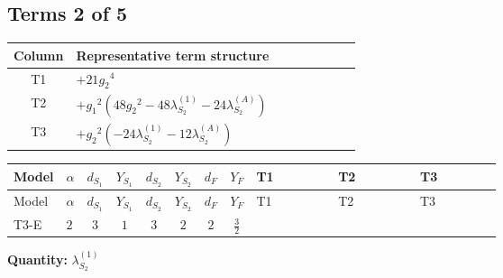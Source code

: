 \documentclass[8pt]{article}
\begin{document}
\begin{landscape}
\subsection*{Terms 2 of 5}
\begin{center}
\begin{tabular}{@{}c >{\raggedright\arraybackslash}p{0.82\linewidth}@{}}
\toprule
Column & Representative term structure \\
\midrule
T1 & \(\displaystyle +21 {g_2}^4\) \\
\midrule
T2 & \(\displaystyle +{g_1}^2 \left(48 {g_2}^2-48 {\lambda_{S_2}^{(1)}}-24 {\lambda_{S_2}^{(A)}}\right)\) \\
\midrule
T3 & \(\displaystyle +{g_2}^2 (-24 {\lambda_{S_2}^{(1)}}-12 {\lambda_{S_2}^{(A)}})\) \\
\midrule
\bottomrule
\end{tabular}
\end{center}
\smallskip
\tiny
\begin{longtable}{@{}llcccccc >{\raggedright\arraybackslash}p{0.21\linewidth} >{\raggedright\arraybackslash}p{0.21\linewidth} >{\raggedright\arraybackslash}p{0.21\linewidth}@{}}
\toprule
Model & $\alpha$ & $d_{S_1}$ & $Y_{S_1}$ & $d_{S_2}$ & $Y_{S_2}$ & $d_F$ & $Y_F$ & T1 & T2 & T3 \\
\midrule
\endfirsthead
\toprule
Model & $\alpha$ & $d_{S_1}$ & $Y_{S_1}$ & $d_{S_2}$ & $Y_{S_2}$ & $d_F$ & $Y_F$ & T1 & T2 & T3 \\
\midrule
\endhead
T3-E & $2$ & $3$ & $1$ & $3$ & $2$ & $2$ & $\frac{3}{2}$ & \scriptsize\adjustbox{max width=\linewidth}{$\begin{gathered} +21 {g_2}^4\end{gathered}$} & \scriptsize\adjustbox{max width=\linewidth}{$\begin{gathered} +{g_1}^2 \left(48 {g_2}^2-48 {\lambda_{S_2}^{(1)}}-24 {\lambda_{S_2}^{(A)}}\right)\end{gathered}$} & \scriptsize\adjustbox{max width=\linewidth}{$\begin{gathered} +{g_2}^2 (-24 {\lambda_{S_2}^{(1)}}-12 {\lambda_{S_2}^{(A)}})\end{gathered}$} \\
\midrule
\bottomrule
\end{longtable}
\clearpage
\noindent\textbf{Quantity: }$\lambda_{S_2}^{(1)}$\par\smallskip

\end{landscape}
\end{document}
